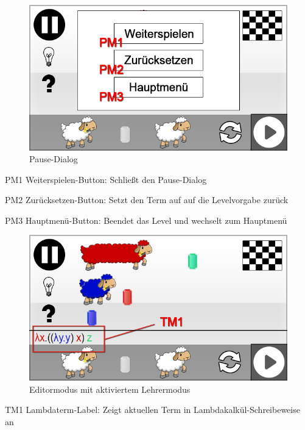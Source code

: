 \begin{figure}[H]
\centering
\includegraphics[scale=0.55]{../gui/_jpeg_numeration/game_paused.jpg}
\caption{Pause-Dialog}
\label{fig:Editormodus_Paused}
\end{figure}
\begin{description*}
\item[PM1] Weiterspielen-Button: Schließt den Pause-Dialog
\item[PM2] Zurücksetzen-Button: Setzt den Term auf auf die Levelvorgabe zurück
\item[PM3] Hauptmenü-Button: Beendet das Level und wechselt zum Hauptmenü
\end{description*}


\begin{figure}[H]
\centering
\includegraphics[scale=0.55]{../gui/_jpeg_numeration/game_teachermode.jpg}
\caption{Editormodus mit aktiviertem Lehrermodus}
\label{fig:Editormodus_TM}
\end{figure}
\begin{description*}
\item[TM1] Lambdaterm-Label: Zeigt aktuellen Term in Lambdakalkül-Schreibeweise an
\end{description*}

